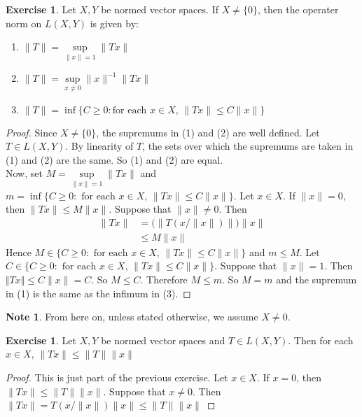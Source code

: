 \documentclass[12pt]{amsart}
\theoremstyle{definition}
\newtheorem{note}[definition]{Note}
\newtheorem{ex}[definition]{Exercise}
\DeclareMathOperator*{\0}{\mbf{0}}
\DeclareMathOperator*{\1}{\mbf{1}}
\newcommand{\lex}[1]{\label{ex:#1}}
\begin{document}
	\begin{ex} \lex{42006}
		Let $X,Y$ be normed vector spaces. If $X\neq \{0\}$, then the operater norm on $L(X,Y)$ is given by: 
		\begin{enumerate}
			\item $\|T\| = \sup\limits_{\|x\|=1}\|Tx\|$
			\item $\|T\| = \sup\limits_{x \neq 0}\|x\|^{-1} \|Tx\|$
			\item $\|T\| = \inf \{C \geq 0: \text{for each }x \in X\text{, } \|Tx \|\leq C\|x\|\}$
		\end{enumerate}
	\end{ex}
	
	\begin{proof} Since $X \neq \{0\}$, the supremums in (1) and (2) are well defined. Let $T \in L(X,Y)$. By linearity of $T$, the sets over which the supremums are taken in (1) and (2) are the same. So (1) and (2) are equal.\\
		Now, set $M = \sup\limits_{\|x \|=1} \|Tx \|$ and $m = \inf \{C \geq 0: \text{ for each }x \in X\text{, } \|Tx \|\leq C \|x \|\}$. Let $x \in X$. If $\|x \|=0$, then $\|Tx \|\leq M \|x \|$. Suppose that $\|x \|\neq 0$. Then 
		\begin{align*}
			\|Tx \|
			&= \bigg(\big\|T(x/\|x\|)\big\|\bigg)\|x \|\\
			& \leq M \|x\|
		\end{align*}
		Hence $M \in \{C \geq 0: \text{ for each }x \in X\text{, } \|Tx \|\leq C \|x \|\}$ and $m \leq M$.
		Let $C \in \{C \geq 0: \text{ for each }x \in X\text{, } \|Tx \|\leq C \|x\|\}$. Suppose that $\|x \|=1$. Then $\Vert Tx\Vert \leq C \|x \|= C$. So $M \leq C$. Therefore $M \leq m$. So $M=m$ and the supremum in (1) is the same as the infimum in (3). 
	\end{proof}
	
	\begin{note}
		From here on, unless stated otherwise, we assume $X \neq 0$.
	\end{note}
	
	\begin{ex} \lex{42007}
		Let $X,Y$ be normed vector spaces and $T \in L(X,Y)$. Then for each $x \in X$, $\|Tx \| \leq \|T\|\|x \|$
	\end{ex}
	
	\begin{proof}
		This is just part of the previous exercise. Let $x \in X$. If $x = 0$, then $\|Tx \|\leq \|T \|\|x \|$. Suppose that $x \neq 0$. Then $\|Tx \|= T(x/\|x\|)\|x\|\leq \|T \|\|x \|$
	\end{proof}
	
\end{document}
